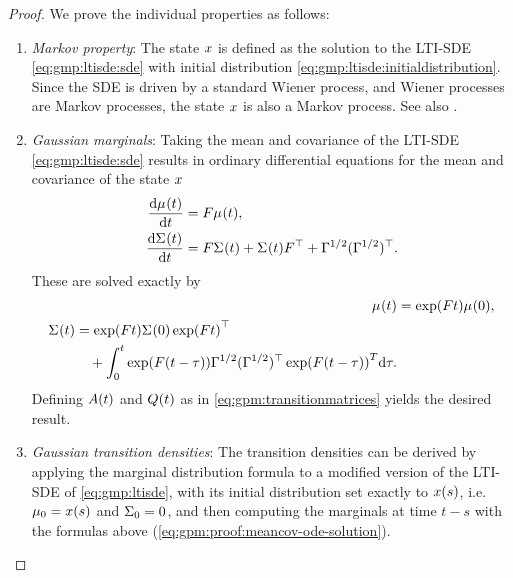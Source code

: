 \documentclass{mimosis}
\begin{document}
\begin{proof}
We prove the individual properties as follows:
\begin{enumerate}[nosep]
\item \emph{Markov property}:
The state \(x\) is defined as the solution to the LTI-SDE
\cref{eq:gmp:ltisde:sde}
with initial distribution
\cref{eq:gmp:ltisde:initialdistribution}.
Since the SDE is driven by a standard Wiener process, and Wiener processes are Markov processes, the state \(x\) is also a Markov process.
See also \textcite{sarkka_solin_2019}.

\item \emph{Gaussian marginals}:
Taking the mean and covariance of the LTI-SDE \cref{eq:gmp:ltisde:sde} results in ordinary differential equations for the mean and covariance of the state \(x\)
\begin{subequations}
\begin{align}
\label{eq:gpm:proof:meancov-ode}
\dv{\mu_{}(t)}{t} &= F \mu_{}(t), \\
\dv{\Sigma_{}(t)}{t} &= F \Sigma_{}(t) + \Sigma_{}(t) F^\top + \Gamma^{1/2} (\Gamma^{1/2})^\top.
\end{align}
\end{subequations}
These are solved exactly by
\parencite[Section 6.2]{sarkka_solin_2019}
\begin{subequations}
\label{eq:gpm:proof:meancov-ode-solution}
\begin{align}
\label{eq:gpm:proof:meancov-ode-solution}
\mu_{}(t) &= \exp(F t) \mu_{}(0), \\
\begin{split}
\Sigma_{}(t) &= \exp(F t) \Sigma_{}(0) \exp(F t)^\top \\
             &\quad + \int_0^t \exp(F (t-\tau)) \Gamma^{1/2} (\Gamma^{1/2})^\top \exp(F (t-\tau))^T \dd \tau.
\end{split}
\end{align}
\end{subequations}
Defining \(A(t)\) and \(Q(t)\) as in
\cref{eq:gpm:transitionmatrices}
yields the desired result.

\item \emph{Gaussian transition densities}:
The transition densities can be derived by applying the marginal distribution formula to a modified version of the LTI-SDE of \cref{eq:gmp:ltisde}, with its initial distribution set exactly to \(x(s)\), i.e. \(\mu_{0}=x(s)\) and \(\Sigma_{0}=0\),
and then computing the marginals at time \(t-s\) with the formulas above
(\cref{eq:gpm:proof:meancov-ode-solution}).


\end{enumerate}
\end{proof}
\end{document}
